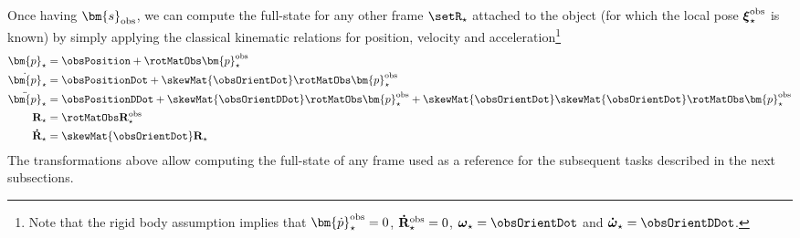 	Once having $\bm{s}_{\rm obs}$, we can compute the full-state for any other frame $\setR_{\star}$ attached to the object (for which the local pose $\boldsymbol{\xi}_{\star}^{\rm obs}$ is known) by simply applying the classical kinematic relations for position, velocity and acceleration\footnote{Note that the rigid body assumption implies that $\bm{\dot{p}}_{\star}^{\rm obs}=0$, $\mathbf{\dot{R}}_{\star}^{\rm obs}=0$, $\boldsymbol{\omega}_{\star} = \obsOrientDot$ and $\boldsymbol{\dot{\omega}}_{\star} = \obsOrientDDot$.}
	\begin{align}
		\label{eq:forward position}	\bm{p}_{\star} &= \obsPosition + \rotMatObs \bm{p}_{\star}^{\rm obs} \\
		\label{eq:forward velocity}	\dot{\bm{p}}_{\star} & = \obsPositionDot + \skewMat{\obsOrientDot} \rotMatObs \bm{p}_{\star}^{\rm obs} \\	
		\label{eq:forward acceleration}	\ddot{\bm{p}}_{\star} & = \obsPositionDDot +\skewMat{\obsOrientDDot} \rotMatObs \bm{p}_{\star}^{\rm obs}  + \skewMat{\obsOrientDot} \skewMat{\obsOrientDot}\rotMatObs \bm{p}_{\star}^{\rm obs}\\
		\label{eq:rotation matrix for grasp frame}\mathbf{R}_{\star} &= \rotMatObs\mathbf{R}_{\star}^{\rm obs}\\%
		\label{eq:rotation matrix derivatuve for grasp frame}\mathbf{\dot{R}}_{\star} &= \skewMat{\obsOrientDot}\mathbf{R}_{\star}
	\end{align}
	The transformations above allow computing the full-state of any frame used as a reference for the subsequent tasks described in the next subsections. 
